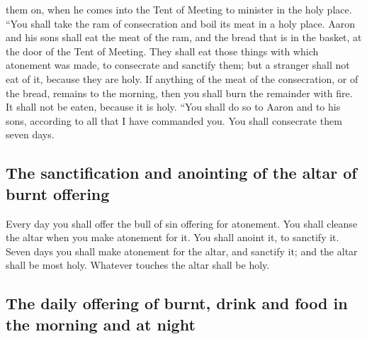 them on, when he comes into the Tent of Meeting to minister in the holy
place.  ``You shall take the ram of consecration and boil
its meat in a holy place.  Aaron and his sons shall eat
the meat of the ram, and the bread that is in the basket, at the door of
the Tent of Meeting.  They shall eat those things with
which atonement was made, to consecrate and sanctify them; but a
stranger shall not eat of it, because they are holy.  If
anything of the meat of the consecration, or of the bread, remains to
the morning, then you shall burn the remainder with fire. It shall not
be eaten, because it is holy.  ``You shall do so to Aaron
and to his sons, according to all that I have commanded you. You shall
consecrate them seven days.

\hypertarget{the-sanctification-and-anointing-of-the-altar-of-burnt-offering}{%
\subsection{The sanctification and anointing of the altar of burnt
offering}\label{the-sanctification-and-anointing-of-the-altar-of-burnt-offering}}

 Every day you shall offer the bull of sin offering for
atonement. You shall cleanse the altar when you make atonement for it.
You shall anoint it, to sanctify it.  Seven days you
shall make atonement for the altar, and sanctify it; and the altar shall
be most holy. Whatever touches the altar shall be holy.

\hypertarget{the-daily-offering-of-burnt-drink-and-food-in-the-morning-and-at-night}{%
\subsection{The daily offering of burnt, drink and food in the morning
and at
night}\label{the-daily-offering-of-burnt-drink-and-food-in-the-morning-and-at-night}}

